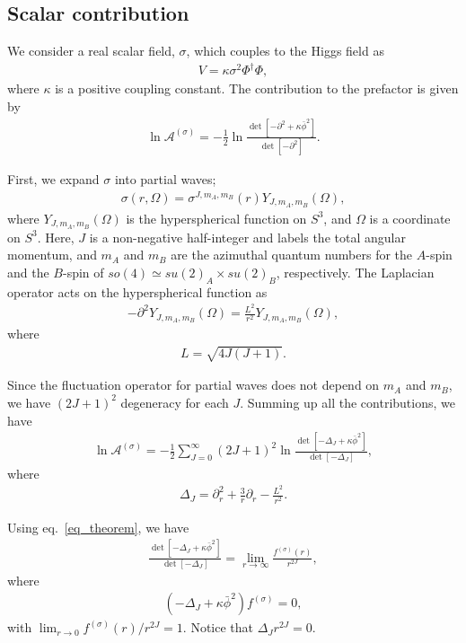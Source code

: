 \documentclass[12pt]{article}
\begin{document}
\subsection{Scalar contribution}

We consider a real scalar field, $\sigma$, which couples to the Higgs
field as
\begin{align}
  V=\kappa\sigma^2\Phi^\dagger\Phi,
\end{align}
where $\kappa$ is a positive coupling constant.  The contribution to the
prefactor is given by
\begin{align}
  \ln\mathcal A^{(\sigma)}
  = -\frac{1}{2}\ln\frac{\det[-\partial^2+\kappa\bar\phi^2]}{\det[-\partial^2]}.
\end{align}

First, we expand $\sigma$ into partial waves;
\begin{align}
  \sigma(r,\Omega) = \sigma^{J,m_A,m_B}(r)Y_{J,m_A,m_B}(\Omega),
\end{align}
where $Y_{J,m_A,m_B}(\Omega)$ is the hyperspherical function on $S^3$,
and $\Omega$ is a coordinate on $S^3$. Here, $J$ is a non-negative
half-integer and labels the total angular momentum, and $m_A$ and $m_B$
are the azimuthal quantum numbers for the $A$-spin and the $B$-spin of
$so(4)\simeq su(2)_A\times su(2)_B$, respectively. The Laplacian
operator acts on the hyperspherical function as
\begin{align}
 -\partial^2 Y_{J,m_A,m_B}(\Omega) = \frac{L^2}{r^2}Y_{J,m_A,m_B}(\Omega),
\end{align}
where
\begin{align}
 L = \sqrt{4J(J+1)}.
\end{align}

Since the fluctuation operator for partial waves does not depend on
$m_A$ and $m_B$, we have $(2J+1)^2$ degeneracy for each $J$.  Summing up
all the contributions, we have
\begin{align}
 \ln\mathcal A^{(\sigma)}
 = -\frac{1}{2}\sum_{J=0}^{\infty}(2J+1)^2
 \ln\frac{\det[-\Delta_J+\kappa\bar\phi^2]}{\det[-\Delta_J]},
\end{align}
where
\begin{align}
 \Delta_J = \partial_r^2+\frac{3}{r}\partial_r-\frac{L^2}{r^2}.
\end{align}

Using eq.~\eqref{eq_theorem}, we have
\begin{align}
 \frac{\det[-\Delta_J+\kappa\bar\phi^2]}{\det[-\Delta_J]}
 = \lim_{r\to\infty}\frac{f^{(\sigma)}(r)}{r^{2J}},
\end{align}
where
\begin{align}
 (-\Delta_J+\kappa\bar\phi^2)f^{(\sigma)} = 0,
\end{align}
with $\lim_{r\to0}f^{(\sigma)}(r)/r^{2J} = 1$. Notice that
$\Delta_Jr^{2J} = 0$.
\end{document}
